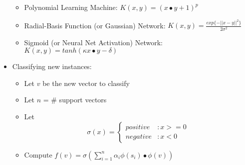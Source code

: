\documentclass[fontsize=4pt]{scrartcl}
\begin{document}
\begin{multicols}{3}
\begin{itemize}
\begin {itemize}
				\begin{itemize}
					\item Polynomial Learning Machine: $K(x, y) = (x \bullet y + 1) ^ p$
					\item Radial-Basis Function (or Gaussian) Network: $K(x, y) = \frac {exp\{-||x - y||^2\}} {2\sigma^2}$
					\item Sigmoid (or Neural Net Activation) Network: $K(x, y) = tanh(\kappa x \bullet y - \delta)$
				\end{itemize}
		\end{itemize}
	\item Classifying new instances:
		\begin{itemize}
			\item Let $v$ be the new vector to classify
			\item Let $n$ = \# support vectors
			\item Let \begin{displaymath}
					\sigma(x) = \left\{
					\begin{array}{lr}
						positive & : x >= 0 \\
						negative & : x < 0
					\end{array}
					\right.
				\end{displaymath}
			\item Compute $f(v) = \sigma(\sum_{i=1}^{n} \alpha_i \phi(s_i) \bullet \phi(v) )$
		\end{itemize}
\end{itemize}


\end{multicols}
\end{document}
